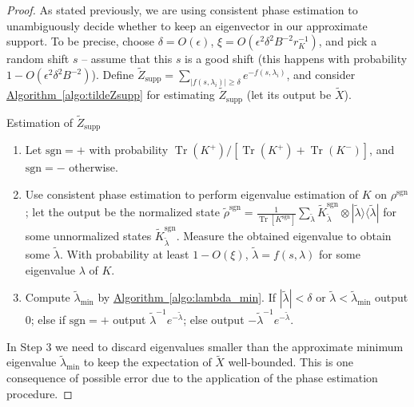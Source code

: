 \documentclass[a4paper,UKenglish,cleveref, autoref]{lipics-v2019}
\theoremstyle{remark}
\numberwithin{equation}{section}
\numberwithin{oracle}{section}
\numberwithin{remark}{section}
\newcommand{\algo}[1]{\hyperref[algo:#1]{Algorithm~\ref*{algo:#1}}}
\newcommand{\ket}[1]{|#1\rangle}
\newcommand{\bra}[1]{\langle#1|}
\newcommand{\eps}{\varepsilon}
\DeclareMathOperator{\tr}{Tr}
\def \eps {\epsilon}
\begin{document}
\begin{proof}
As stated previously, we are using consistent phase estimation to unambiguously decide whether to keep an eigenvector in our approximate support. To be precise, choose $\delta = O(\eps)$, $\xi = O(\eps^2\delta^2 B^{-2}r_{K}^{-1})$, and pick a random shift $s$ -- assume that this $s$ is a good shift (this happens with probability $1 - O(\eps^2\delta^2B^{-2})$). Define $\widetilde{Z}_{\text{supp}} = \sum_{|f(s,\lambda_i)| \ge \delta} e^{-f(s,\lambda_i)}$, and consider \algo{tildeZsupp} for estimating $\widetilde{Z}_{\text{supp}}$ (let its output be $\widetilde{X}$).
\begin{algorithm}
\caption{Estimation of $\widetilde{Z}_{\text{supp}}$}
 \label{algo:tildeZsupp}
\begin{enumerate}
\item Let $\text{sgn} = +$ with probability $\tr(K^+)/[\tr(K^+)+\tr(K^-)]$, and $\text{sgn} = -$ otherwise.
\item Use consistent phase estimation to perform eigenvalue estimation of $K$ on $\rho^{\text{sgn}}$; let the output be the normalized state $\tilde{\rho}^{\text{sgn}} = \frac{1}{\tr[K^{\text{sgn}}]}\sum_{\tilde{\lambda}} \widetilde{K}^{\text{sgn}}_{\tilde{\lambda}} \otimes \ket{\tilde{\lambda}}\bra{\tilde{\lambda}}$ for some unnormalized states $\widetilde{K}^{\text{sgn}}_{\tilde{\lambda}}$. Measure the obtained eigenvalue to obtain some $\tilde{\lambda}$. With probability at least $1-O(\xi)$, $\tilde{\lambda} = f(s,\lambda)$ for some eigenvalue $\lambda$ of $K$.
\item Compute $\tilde{\lambda}_{\min}$ by \algo{lambda_min}. If $|\tilde{\lambda}| < \delta$ or $\tilde{\lambda} < \tilde{\lambda}_{\text{min}}$ output 0; else if $\text{sgn}=+$ output $\tilde{\lambda}^{-1}e^{-\tilde{\lambda}}$; else output $-\tilde{\lambda}^{-1}e^{-\tilde{\lambda}}$.
\end{enumerate}
\end{algorithm}
In Step 3 we need to discard eigenvalues smaller than the approximate minimum eigenvalue $\tilde{\lambda}_{\text{min}}$ to keep the expectation of $\tilde{X}$ well-bounded. This is one consequence of possible error due to the application of the phase estimation procedure.


\end{proof}
\end{document}
